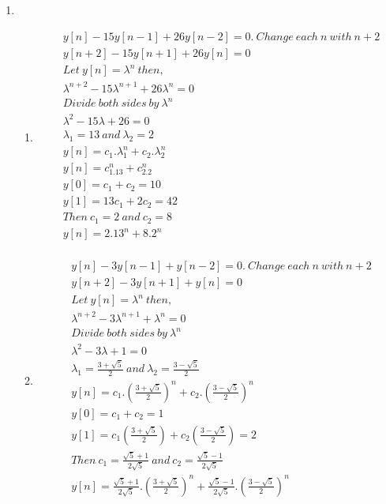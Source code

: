 \documentclass[10pt,a4paper, margin=1in]{article}
\begin{document}
\begin{enumerate}
\begin{enumerate}
    \end{enumerate}

\item 
    \begin{enumerate}
    \item %
    \begin{align*}
    &y[n] - 15y[n-1] + 26y[n-2] = 0. \ Change \ each \ n \ with \ n+2 \\
    &y[n+2] - 15y[n+1] + 26y[n] = 0 \\
    &Let \ y[n]=\lambda^n \ then, \\
    &\lambda^{n+2} - 15\lambda^{n+1} + 26\lambda^{n} = 0 \\
    &Divide \ both \ sides \ by \ \lambda^{n} \\
    &\lambda^{2} - 15\lambda + 26 = 0 \\
    &\lambda_1 = 13 \ and \ \lambda_2 = 2 \\
    &y[n] = c_1.\lambda_1^n + c_2.\lambda_2^n \\
    &y[n] = c_1.13^n + c_2.2^n \\
    &y[0] = c_1 + c_2 = 10 \\
    &y[1] = 13c_1 + 2c_2 = 42 \\
    &Then \ c_1 = 2 \ and \ c_2 = 8 \\
    &y[n] = 2.13^n + 8.2^n \\
    \end{align*}
    
    \item %
    \begin{align*}
    &y[n] - 3y[n-1] + y[n-2] = 0. \ Change \ each \ n \ with \ n+2 \\
    &y[n+2] - 3y[n+1] + y[n] = 0 \\
    &Let \ y[n]=\lambda^n \ then, \\
    &\lambda^{n+2} - 3\lambda^{n+1} + \lambda^{n} = 0 \\
    &Divide \ both \ sides \ by \ \lambda^{n} \\
    &\lambda^{2} - 3\lambda + 1 = 0 \\
    &\lambda_1 = \frac{3 + \sqrt{5}}{2} \ and \ \lambda_2 = \frac{3 - \sqrt{5}}{2} \\
    &y[n] = c_1.(\frac{3 + \sqrt{5}}{2})^n + c_2.(\frac{3 - \sqrt{5}}{2})^n \\
    &y[0] = c_1 + c_2 = 1 \\
    &y[1] = c_1(\frac{3 + \sqrt{5}}{2}) + c_2(\frac{3 - \sqrt{5}}{2}) = 2 \\
    &Then \ c_1 = \frac{\sqrt{5} + 1}{2\sqrt{5}} \ and \ c_2 = \frac{\sqrt{5} - 1}{2\sqrt{5}} \\
    &y[n] = \frac{\sqrt{5} + 1}{2\sqrt{5}}.(\frac{3 + \sqrt{5}}{2})^n + \frac{\sqrt{5} - 1}{2\sqrt{5}}.(\frac{3 - \sqrt{5}}{2})^n \\
    \end{align*}
    \end{enumerate}


\end{enumerate}
\end{document}
